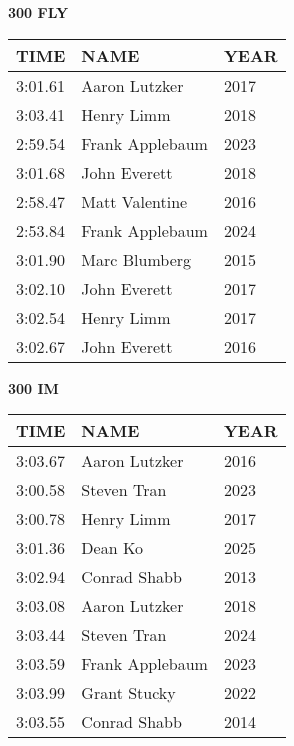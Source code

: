 \begin{minipage}[t]{0.48\textwidth}
\centering
\textbf{300 FLY}\\[0.05cm]
\begin{tabular}{@{}p{1.8cm}p{2.8cm}p{1.2cm}@{}}
\hline
\textbf{TIME} & \textbf{NAME} & \textbf{YEAR} \\
\hline
3:01.61 & Aaron Lutzker & 2017 \\
3:03.41 & Henry Limm & 2018 \\
2:59.54 & Frank Applebaum & 2023 \\
3:01.68 & John Everett & 2018 \\
2:58.47 & Matt Valentine & 2016 \\
2:53.84 & Frank Applebaum & 2024 \\
3:01.90 & Marc Blumberg & 2015 \\
3:02.10 & John Everett & 2017 \\
3:02.54 & Henry Limm & 2017 \\
3:02.67 & John Everett & 2016 \\
\hline
\end{tabular}
\end{minipage}\hfill
\begin{minipage}[t]{0.48\textwidth}
\centering
\textbf{300 IM}\\[0.05cm]
\begin{tabular}{@{}p{1.8cm}p{2.8cm}p{1.2cm}@{}}
\hline
\textbf{TIME} & \textbf{NAME} & \textbf{YEAR} \\
\hline
3:03.67 & Aaron Lutzker & 2016 \\
3:00.58 & Steven Tran & 2023 \\
3:00.78 & Henry Limm & 2017 \\
3:01.36 & Dean Ko & 2025 \\
3:02.94 & Conrad Shabb & 2013 \\
3:03.08 & Aaron Lutzker & 2018 \\
3:03.44 & Steven Tran & 2024 \\
3:03.59 & Frank Applebaum & 2023 \\
3:03.99 & Grant Stucky & 2022 \\
3:03.55 & Conrad Shabb & 2014 \\
\hline
\end{tabular}
\end{minipage}

\vspace{0.4cm}

